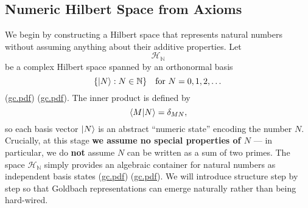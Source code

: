 \documentclass[12pt]{article}
\begin{document}
\subsection{Numeric Hilbert Space from Axioms}
We begin by constructing a Hilbert space that represents natural numbers without assuming anything about their additive properties. Let
\[
\mathcal{H}_{\mathbb{N}}
\]
be a complex Hilbert space spanned by an orthonormal basis 
\[
\{\ket{N}: N\in\mathbb{N}\} \quad \text{for } N=0,1,2,\dots
\]
(\href{file://file-7ZYYwSHWVa83XEVTrEhg5z#:~:text=1,The%20inner}{gc.pdf}) (\href{file://file-7ZYYwSHWVa83XEVTrEhg5z#:~:text=IIntroduction%20Goldbach%E2%80%99s%20Conjecture%20asserts%20that,which%20unifies%20geometric%20algebra%2C%20group}{gc.pdf}). The inner product is defined by
\[
\braket{M|N}=\delta_{MN},
\]
so each basis vector $\ket{N}$ is an abstract “numeric state” encoding the number $N$. Crucially, at this stage \textbf{we assume no special properties of $N$} --- in particular, we do \textbf{not} assume $N$ can be written as a sum of two primes. The space $\mathcal{H}_{\mathbb{N}}$ simply provides an algebraic container for natural numbers as independent basis states (\href{file://file-7ZYYwSHWVa83XEVTrEhg5z#:~:text=encoding%20of%20natural%20numbers%20without,numbers%20as%20independent%20basis%20states}{gc.pdf}) (\href{file://file-7ZYYwSHWVa83XEVTrEhg5z#:~:text=%28to%20keep%20within%20%24%5Cmathbb,it%20is%20simply%20the%20linear}{gc.pdf}). We will introduce structure step by step so that Goldbach representations can emerge naturally rather than being hard-wired.
\end{document}
